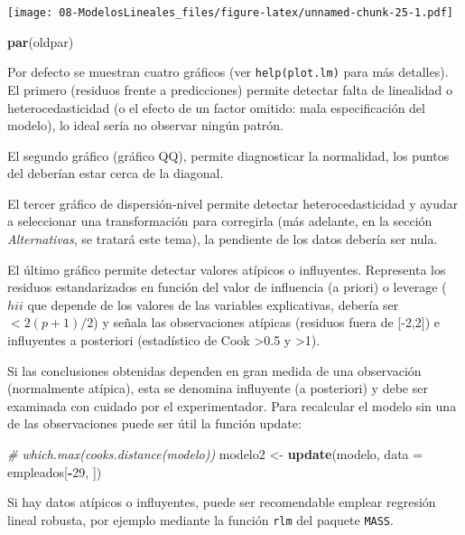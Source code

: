 \documentclass[]{book}
\newenvironment{Shaded}{\begin{snugshade}}{\end{snugshade}}
\newcommand{\CommentTok}[1]{\textcolor[rgb]{0.56,0.35,0.01}{\textit{#1}}}
\newcommand{\DataTypeTok}[1]{\textcolor[rgb]{0.13,0.29,0.53}{#1}}
\newcommand{\DecValTok}[1]{\textcolor[rgb]{0.00,0.00,0.81}{#1}}
\newcommand{\KeywordTok}[1]{\textcolor[rgb]{0.13,0.29,0.53}{\textbf{#1}}}
\newcommand{\NormalTok}[1]{#1}
\newcommand{\OperatorTok}[1]{\textcolor[rgb]{0.81,0.36,0.00}{\textbf{#1}}}
\newcommand{\StringTok}[1]{\textcolor[rgb]{0.31,0.60,0.02}{#1}}
\begin{document}
\texttt{[image: 08-ModelosLineales\_files/figure-latex/unnamed-chunk-25-1.pdf]}

\begin{Shaded}
\begin{Highlighting}[]
\KeywordTok{par}\NormalTok{(oldpar)}
\end{Highlighting}
\end{Shaded}

Por defecto se muestran cuatro gráficos (ver \texttt{help(plot.lm)} para más detalles). El primero (residuos frente a predicciones) permite detectar falta de
linealidad o heterocedasticidad (o el efecto de un factor omitido: mala
especificación del modelo), lo ideal sería no observar ningún patrón.

El segundo gráfico (gráfico QQ), permite diagnosticar la normalidad, los puntos del deberían estar cerca de la diagonal.

El tercer gráfico de dispersión-nivel permite detectar heterocedasticidad y ayudar a seleccionar una transformación para corregirla (más adelante, en la sección \emph{Alternativas}, se tratará este tema), la pendiente de los datos debería ser nula.

El último gráfico permite detectar valores atípicos o influyentes. Representa los residuos estandarizados en función del valor de influencia (a priori) o leverage (\(hii\) que depende de los valores de las variables explicativas, debería ser \(< 2(p+1)/2\)) y señala las observaciones atípicas (residuos fuera de {[}-2,2{]}) e influyentes a posteriori (estadístico de Cook \textgreater{}0.5 y \textgreater{}1).

Si las conclusiones obtenidas dependen en gran medida de una
observación (normalmente atípica), esta se denomina influyente (a
posteriori) y debe ser examinada con cuidado por el experimentador.
Para recalcular el modelo sin una de las observaciones puede ser útil la función update:

\begin{Shaded}
\begin{Highlighting}[]
\CommentTok{# which.max(cooks.distance(modelo))}
\NormalTok{modelo2 <-}\StringTok{ }\KeywordTok{update}\NormalTok{(modelo, }\DataTypeTok{data =}\NormalTok{ empleados[}\OperatorTok{-}\DecValTok{29}\NormalTok{, ])}
\end{Highlighting}
\end{Shaded}

Si hay datos atípicos o influyentes, puede ser recomendable emplear regresión lineal robusta, por ejemplo mediante la función \texttt{rlm} del paquete \texttt{MASS}.
\end{document}
